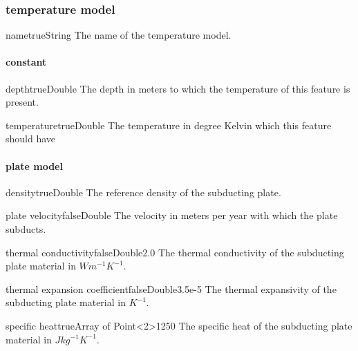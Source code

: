 \documentclass{book}
\begin{document}
\subsubsection{temperature model}
\begin{parameterbox}{name}{true}{String}{}
The name of the temperature model.
\end{parameterbox}

\paragraph{constant}
\begin{parameterbox}{depth}{true}{Double}{}
The depth in meters to which the temperature of this feature is present.
\end{parameterbox}

\begin{parameterbox}{temperature}{true}{Double}{}
The temperature in degree Kelvin which this feature should have
\end{parameterbox}

\paragraph{plate model}
\begin{parameterbox}{density}{true}{Double}{}
The reference density of the subducting plate.
\end{parameterbox}

\begin{parameterbox}{plate velocity}{false}{Double}{}
The velocity in meters per year with which the plate subducts.
\end{parameterbox}

\begin{parameterbox}{thermal conductivity}{false}{Double}{2.0}
The thermal conductivity of the subducting plate material in $W m^{-1} K^{-1}$.
\end{parameterbox}

\begin{parameterbox}{thermal expansion coefficient}{false}{Double}{3.5e-5}
The thermal expansivity of the subducting plate material in $K^{-1}$.
\end{parameterbox}

\begin{parameterbox}{specific heat}{true}{Array of Point<2>}{1250}
The specific heat of the subducting plate material in $J kg^{-1} K^{-1}$.
\end{parameterbox}
\end{document}
